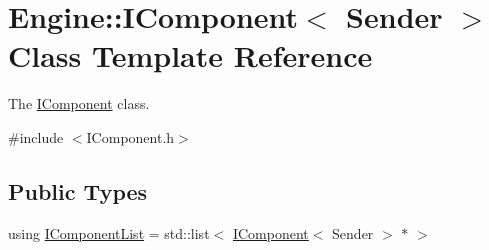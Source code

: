 \hypertarget{classEngine_1_1IComponent}{}\section{Engine\+:\+:I\+Component$<$ Sender $>$ Class Template Reference}
\label{classEngine_1_1IComponent}


The \hyperlink{classEngine_1_1IComponent}{I\+Component} class.  




{\ttfamily \#include $<$I\+Component.\+h$>$}

\subsection*{Public Types}
\begin{DoxyCompactItemize}
\item 
using \hyperlink{classEngine_1_1IComponent_aade5c1f3aa7ac594acc104861fc761c4}{I\+Component\+List} = std\+::list$<$ \hyperlink{classEngine_1_1IComponent}{I\+Component}$<$ Sender $>$ $\ast$ $>$
\end{DoxyCompactItemize}
